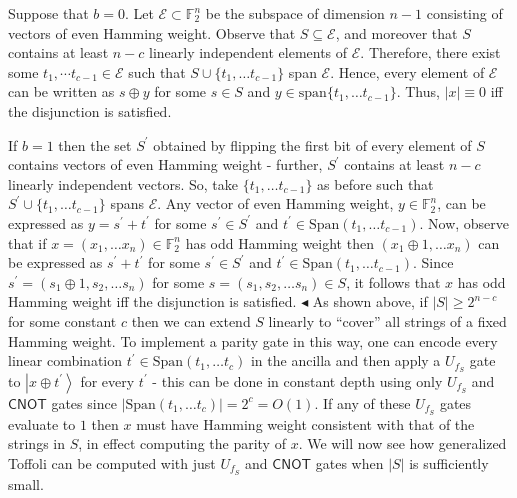 \documentclass[10pt,a4paper]{article}
\begin{document}
Suppose that $b=0$. Let $\mathcal{E}\subset\mathbb{F}_{2}^{n}$ be the subspace of dimension $n-1$ consisting of vectors of even Hamming weight. Observe that $S\subseteq\mathcal{E}$, and moreover that $S$ contains at least $n-c$ linearly independent elements of $\mathcal{E}$. Therefore, there exist some $t_{1},\cdots t_{c-1}\in\mathcal{E}$ such that $S\cup\{t_{1},\dots t_{c-1}\}$ span $\mathcal{E}$. Hence, every element of $\mathcal{E}$ can be written as $s\oplus y$ for some $s\in S$ and $y\in\text{span}\{t_{1},\dots t_{c-1}\}$. Thus, $|x|\equiv 0$ iff the disjunction is satisfied.\par




If $b=1$ then the set $S^{\prime}$ obtained by flipping the first bit of every element of $S$ contains vectors of even Hamming weight - further, $S^{\prime}$ contains at least $n-c$ linearly independent vectors. So, take $\{t_{1},\dots t_{c-1}\}$ as before such that $S^{\prime}\cup\{t_{1},\dots t_{c-1}\}$ spans $\mathcal{E}$. Any vector of even Hamming weight, $y\in\mathbb{F}_{2}^{n}$, can be expressed as $y=s^{\prime}+t^{\prime}$ for some $s^{\prime}\in S^{\prime}$ and $t^{\prime}\in\text{Span}(t_{1},\dots t_{c-1})$. Now, observe that if $x=(x_{1},\dots x_{n})\in\mathbb{F}_{2}^{n}$ has odd Hamming weight then $(x_{1}\oplus 1,\dots x_{n})$ can be expressed as $s^{\prime}+t^{\prime}$ for some $s^{\prime}\in S^{\prime}$ and $t^{\prime}\in\text{Span}(t_{1},\dots t_{c-1})$. Since $s^{\prime}=(s_{1}\oplus 1,s_{2},\dots s_{n})$ for some $s=(s_{1},s_{2},\dots s_{n})\in S$, it follows that $x$ has odd Hamming weight iff the disjunction is satisfied.
$\blacktriangleleft$
As shown above, if $|S|\geq 2^{n-c}$ for some constant $c$ then we can extend $S$ linearly to “cover” all strings of a fixed Hamming weight. To implement a parity gate in this way, one can encode every linear combination $t^{\prime}\in\text{Span}(t_{1},\dots t_{c})$ in the ancilla and then apply a $U_{f_{S}}$ gate to $\left|x\oplus t^{\prime}\right\rangle$ for every $t^{\prime}$ - this can be done in constant depth using only $U_{f_{S}}$ and $\mathsf{CNOT}$ gates since $|\text{Span}(t_{1},\dots t_{c})|=2^{c}=O(1)$. If any of these $U_{f_{S}}$ gates evaluate to $1$ then $x$ must have Hamming weight consistent with that of the strings in $S$, in effect computing the parity of $x$. We will now see how generalized Toffoli can be computed with just $U_{f_{S}}$ and $\mathsf{CNOT}$ gates when $|S|$ is sufficiently small.\par
\end{document}

